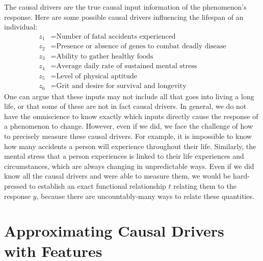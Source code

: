 \documentclass[12pt]{article}
\begin{document}
	The causal drivers are the true causal input information of the phenomenon's response.
	Here are some possible causal drivers influencing the lifespan of an individual:
	\begin{align*}
		z_1 &= \text{Number of fatal accidents experienced}\\
		z_2 &= \text{Presence or absence of genes to combat deadly disease}\\
		z_3 &= \text{Ability to gather healthy foods}\\
		z_4 &= \text{Average daily rate of sustained mental stress}\\
		z_5 &= \text{Level of physical aptitude}\\
		z_6 &= \text{Grit and desire for survival and longevity}
	\end{align*}
	One can argue that these inputs may not include all that goes into living
	a long life, or that some of these are not in fact causal drivers. In general,
	we do not have the omniscience to know exactly which inputs directly cause the
	response of a phenomenon to change. However, even if we did, we face the challenge
	of how to precisely measure these causal drivers. For example, it is impossible
	to know how many accidents a person will experience throughout their life.
	Similarly, the mental stress that a person experiences is linked to their
	life experiences and circumstances, which are always changing in unpredictable ways.
	Even if we did know all the causal drivers and were able to measure them,
	we would be hard-pressed to establish an exact functional relationship $t$
	relating them to the response $y$, because there are uncountably-many
	ways to relate these quantities.

	\section{Approximating Causal Drivers with Features}
\end{document}
